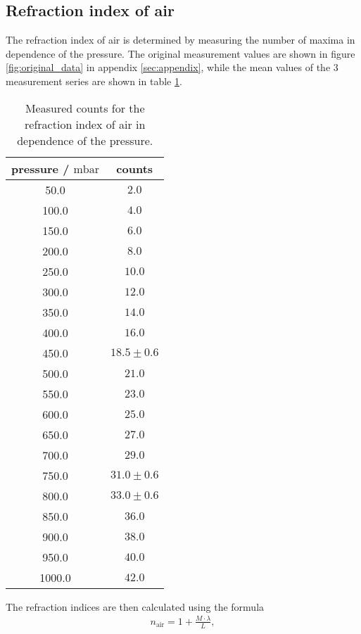 \subsection{Refraction index of air}
\label{subsec:refraction_air}

The refraction index of air is determined by measuring the number of maxima in dependence of the pressure.
The original measurement values are shown in figure \ref{fig:original_data} in appendix \ref{sec:appendix}, while the mean values of the 3 measurement series are shown in table \ref{tab:refraction_air}.
\begin{table}[H]
    \centering
    \begin{tabular}{c c}
        \toprule
        pressure / $\si{\milli\bar}$  & counts \\    
        \midrule
        50.0 & $2.0$\\
        100.0 & $4.0$\\
        150.0 & $6.0$\\
        200.0 & $8.0$\\
        250.0 & $10.0$\\
        300.0 & $12.0$\\
        350.0 & $14.0$\\
        400.0 & $16.0$\\
        450.0 & $18.5\pm0.6$\\
        500.0 & $21.0$\\
        550.0 & $23.0$\\
        600.0 & $25.0$\\
        650.0 & $27.0$\\
        700.0 & $29.0$\\
        750.0 & $31.0\pm0.6$\\
        800.0 & $33.0\pm0.6$\\
        850.0 & $36.0$\\
        900.0 & $38.0$\\
        950.0 & $40.0$\\
        1000.0 & $42.0$\\
    \end{tabular}
    \caption{Measured counts for the refraction index of air in dependence of the pressure.}
    \label{tab:refraction_air}
\end{table}
\noindent
The refraction indices are then calculated using the formula
\begin{align}
    n_{\text{air}} = 1 + \frac{M\cdot\lambda}{L},
\end{align}
